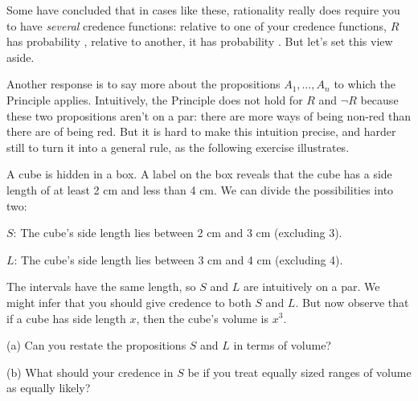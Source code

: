 Some have concluded that in cases like these, rationality really does
require you to have \emph{several} credence functions: relative to one
of your credence functions, $R$ has probability ,
relative to another, it has probability . But let's set
this view aside.

Another response is to say more about the propositions
$A_1,\ldots,A_n$ to which the Principle applies. Intuitively, the
Principle does not hold for $R$ and $\neg R$ because these two
propositions aren't on a par: there are more ways of being non-red
than there are of being red. But it is hard to make this
intuition precise, and harder still to turn it into a general rule, as
the following exercise illustrates.

\begin{exercise}\label{e:cubefactory}
  A cube is hidden in a box. A label on the box reveals that the cube
  has a side length of at least 2 cm and less than 4 cm. We can divide
  the possibilities into two:
  \begin{enumerate*}
  \item[$S$:] The cube's side length lies between 2 cm and 3 cm (excluding 3).
  \item[$L$:] The cube's side length lies between 3 cm and 4 cm (excluding 4).
  \end{enumerate*}
  The intervals have the same length, so $S$ and $L$ are intuitively
  on a par. We might infer that you should give credence
   to both $S$ and $L$. But now observe that if a cube
  has side length $x$, then the cube's volume is $x^3$.
  \begin{enumerate*}
  \item[(a)] Can you restate the propositions $S$ and $L$ in terms of
    volume?
  \item[(b)] What should your credence in $S$ be if you treat equally
    sized ranges of volume as equally likely?
  \end{enumerate*}
  \vspace{-6mm}
\end{exercise}

